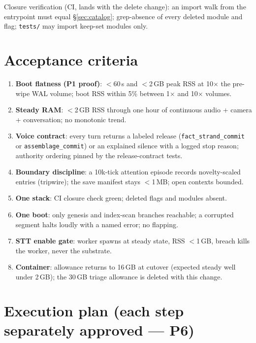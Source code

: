 \documentclass[11pt]{article}
\begin{document}
Closure verification (CI, lands with the delete change): an import walk
from the entrypoint must equal \S\ref{sec:catalog}; grep-absence of every
deleted module and flag; \texttt{tests/} may import keep-set modules only.

\section{Acceptance criteria}\label{sec:accept}

\begin{enumerate}[nosep]
  \item \textbf{Boot flatness (P1 proof)}: $<$60\,s and $<$2\,GB peak RSS
        at 10$\times$ the pre-wipe WAL volume; boot RSS within 5\% between
        1$\times$ and 10$\times$ volumes.
  \item \textbf{Steady RAM}: $<$2\,GB RSS through one hour of continuous
        audio + camera + conversation; no monotonic trend.
  \item \textbf{Voice contract}: every turn returns a labeled release
        (\texttt{fact\_strand\_commit} or \texttt{assemblage\_commit}) or
        an explained silence with a logged stop reason; authority ordering
        pinned by the release-contract tests.
  \item \textbf{Boundary discipline}: a 10k-tick attention episode records
        novelty-scaled entries (tripwire); the save manifest stays
        $<$1\,MB; open contexts bounded.
  \item \textbf{One stack}: CI closure check green; deleted flags and
        modules absent.
  \item \textbf{One boot}: only genesis and index-scan branches reachable;
        a corrupted segment halts loudly with a named error; no flapping.
  \item \textbf{STT enable gate}: worker spawns at steady state, RSS
        $<$1\,GB, breach kills the worker, never the substrate.
  \item \textbf{Container}: allowance returns to 16\,GB at cutover
        (expected steady well under 2\,GB); the 30\,GB triage allowance is
        deleted with this change.
\end{enumerate}

\section{Execution plan (each step separately approved — P6)}
\end{document}
